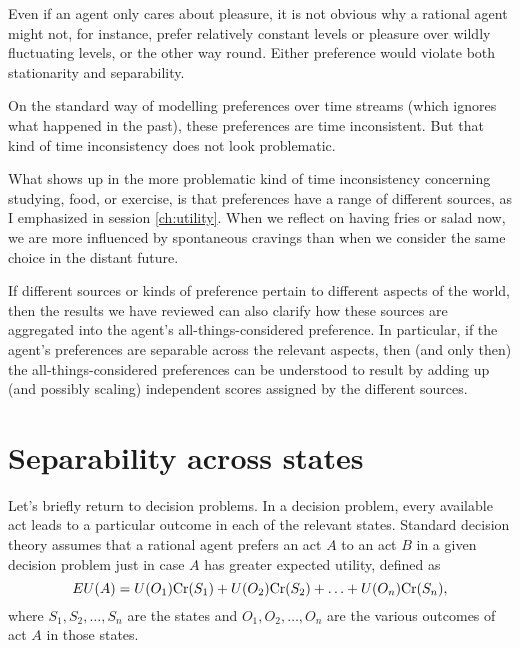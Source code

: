 Even if an agent only cares about pleasure, it is not obvious why a
rational agent might not, for instance, prefer relatively constant
levels or pleasure over wildly fluctuating levels, or the other way
round. Either preference would violate both stationarity and
separability.


On the standard way of modelling preferences over time streams (which
ignores what happened in the past), these preferences are time
inconsistent. But that kind of time inconsistency does not look
problematic.

What shows up in the more problematic kind of time inconsistency
concerning studying, food, or exercise, is that preferences have a
range of different sources, as I emphasized in session
\ref{ch:utility}. When we reflect on having fries or salad now, we are
more influenced by spontaneous cravings than when we consider the same
choice in the distant future.

If different sources or kinds of preference pertain to different
aspects of the world, then the results we have reviewed can also clarify
how these sources are aggregated into the agent's
all-things-considered preference. In particular, if the agent's
preferences are separable across the relevant aspects, then (and only
then) the all-things-considered preferences can be understood to
result by adding up (and possibly scaling) independent scores assigned
by the different sources.

%

\section{Separability across states}

Let's briefly return to decision problems. In a decision problem,
every available act leads to a particular outcome in each of the
relevant states. Standard decision theory assumes that a rational
agent prefers an act $A$ to an act $B$ in a given decision problem
just in case $A$ has greater expected utility, defined as
\[
EU(A) = U(O_1)\text{Cr}(S_1) + U(O_2)\text{Cr}(S_2) + \ldots + U(O_n)\text{Cr}(S_n),
\]
where $S_1,S_2,\ldots,S_n$ are the states and $O_1,O_2,\ldots,O_n$ are
the various outcomes of act $A$ in those states.

